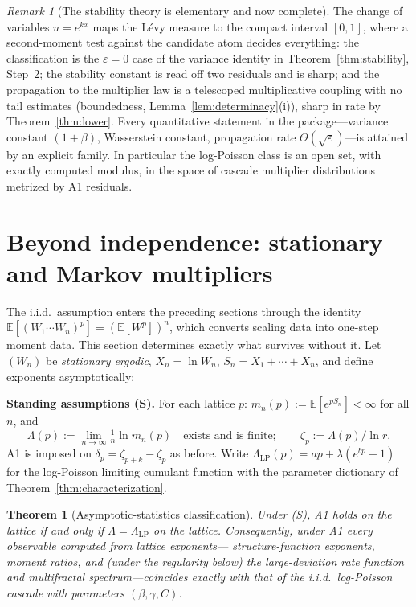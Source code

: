 \documentclass[12pt]{amsart}
\newtheorem{theorem}{Theorem}
\theoremstyle{definition}
\theoremstyle{remark}
\newtheorem*{remark}{Remark}
\begin{document}
\begin{remark}[The stability theory is elementary and now
complete]
The change of variables $u = e^{kx}$ maps the L\'evy measure to the
compact interval $[0,1]$, where a second-moment test against the
candidate atom decides everything: the classification is the
$\varepsilon = 0$ case of the variance identity in
Theorem~\ref{thm:stability}, Step~2; the stability constant is read
off two residuals and is sharp; and the propagation to the
multiplier law is a telescoped multiplicative coupling with no tail
estimates (boundedness, Lemma~\ref{lem:determinacy}(i)), sharp in
rate by Theorem~\ref{thm:lower}.  Every quantitative statement in
the package---variance constant $(1+\beta)$, Wasserstein constant,
propagation rate $\Theta(\sqrt\varepsilon)$---is attained by an
explicit family.  In particular the log-Poisson class is an open
set, with exactly computed modulus, in the space of cascade
multiplier distributions metrized by A1 residuals.
\end{remark}


\section{Beyond independence: stationary and Markov multipliers}
\label{sec:beyond}

The i.i.d.\ assumption enters the preceding sections through the
identity $\mathbb{E}[(W_1\cdots W_n)^p] = (\mathbb{E}[W^p])^n$,
which converts scaling data into one-step moment data.  This section
determines exactly what survives without it.  Let $(W_n)$ be
\emph{stationary ergodic}, $X_n = \ln W_n$, $S_n = X_1 + \cdots +
X_n$, and define exponents asymptotically:

\smallskip
\noindent\textbf{Standing assumptions (S).}  For each lattice $p$:
$m_n(p) := \mathbb{E}[e^{pS_n}] < \infty$ for all $n$, and
\[
  \Lambda(p) := \lim_{n\to\infty}\tfrac1n\ln m_n(p)
  \quad\text{exists and is finite};
  \qquad \zeta_p := \Lambda(p)/\ln r .
\]
A1 is imposed on $\delta_p = \zeta_{p+k}-\zeta_p$ as before.  Write
$\Lambda_{\mathrm{LP}}(p) = ap + \lambda(e^{bp}-1)$ for the
log-Poisson limiting cumulant function with the parameter dictionary
of Theorem~\ref{thm:characterization}.

\begin{theorem}[Asymptotic-statistics classification]\label{thm:cgflevel}
Under \textup{(S)}, A1 holds on the lattice if and only if
$\Lambda = \Lambda_{\mathrm{LP}}$ on the lattice.  Consequently,
under A1 every observable computed from lattice exponents---%
structure-function exponents, moment ratios, and (under the
regularity below) the large-deviation rate function and multifractal
spectrum---coincides exactly with that of the i.i.d.\ log-Poisson
cascade with parameters $(\beta, \gamma, C)$.
\end{theorem}
\end{document}

